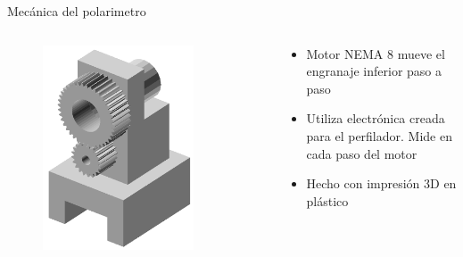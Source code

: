 \begin{frame}{Mecánica del polarimetro}
    \begin{columns}
        \begin{column}{0.5\textwidth}
            \begin{figure}[H]
                \centering
                \includegraphics[width=0.8\textwidth]{fig/polarimetro/soporte_all}
                \label{fig:polarimetro/soporte_all}
            \end{figure}
        \end{column}
        \begin{column}{0.5\textwidth}
            \begin{itemize}
                \item Motor NEMA 8 mueve el engranaje inferior paso a paso
                \item Utiliza electrónica creada para el perfilador. Mide en cada paso del motor
                \item Hecho con impresión 3D en plástico
            \end{itemize} 
        \end{column}
    \end{columns}
\end{frame}

